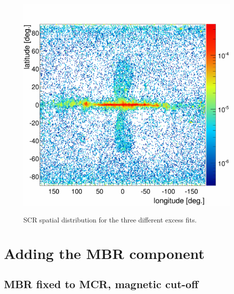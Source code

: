 \begin{figure}[h]
\begin{minipage}[h]{0.3\textwidth}
	  \label{}
  \end{minipage}
  \hfill
  \begin{minipage}[h]{0.3\textwidth}
	  \centering
	  \includegraphics[width=1.\linewidth]{pic/discussion/MSPonly_fine_SCR_integral_distribution.png}
	  \label{}
  \end{minipage}
  \caption{SCR spatial distribution for the three different excess fits.}
  \label{fig:SCR_flux_distrib_excess_comp}	 
\end{figure}







\section{Adding the MBR component}

\subsection{MBR fixed to MCR, magnetic cut-off}

